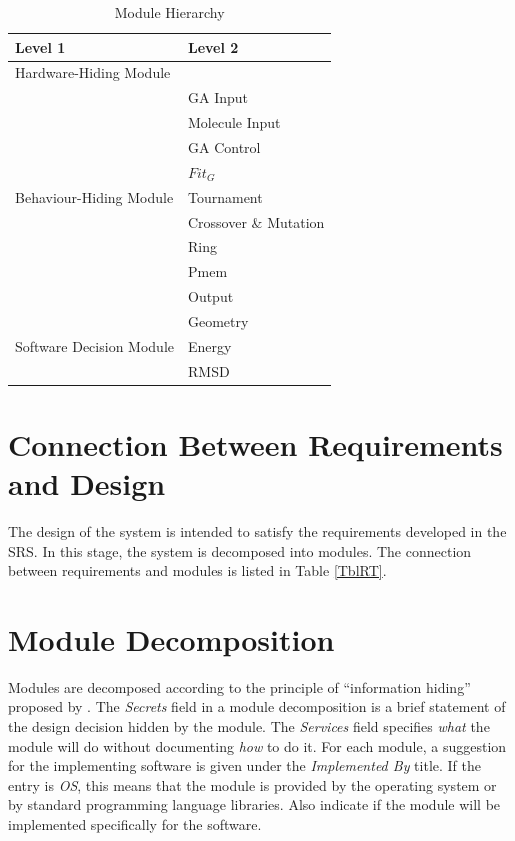 \documentclass[12pt, titlepage]{article}
\begin{document}
\begin{table}[h!]
\centering
\begin{tabular}{p{} p{}}
\toprule
\textbf{Level 1} & \textbf{Level 2}\\
\midrule

{Hardware-Hiding Module} & ~ \\
\midrule

\multirow{9}{0.3\textwidth}{Behaviour-Hiding Module}& GA Input \\
													& Molecule Input \\
													& GA Control\\
													& $Fit_G$ \\
													& Tournament \\
													& Crossover \& Mutation \\
													& Ring \\
													& Pmem \\
													& Output \\

\midrule

\multirow{3}{0.3\textwidth}{Software Decision Module} & Geometry \\
													  & Energy \\
													  & RMSD \\
\bottomrule

\end{tabular}
\caption{Module Hierarchy}
\label{TblMH}
\end{table}

\section{Connection Between Requirements and Design} \label{SecConnection}

The design of the system is intended to satisfy the requirements developed in
the SRS. In this stage, the system is decomposed into modules. The connection
between requirements and modules is listed in Table \ref{TblRT}.

\section{Module Decomposition} \label{SecMD}

Modules are decomposed according to the principle of ``information hiding''
proposed by \citet{ParnasEtAl1984}. The \emph{Secrets} field in a module
decomposition is a brief statement of the design decision hidden by the
module. The \emph{Services} field specifies \emph{what} the module will do
without documenting \emph{how} to do it. For each module, a suggestion for the
implementing software is given under the \emph{Implemented By} title. If the
entry is \emph{OS}, this means that the module is provided by the operating
system or by standard programming language libraries.  Also indicate if the
module will be implemented specifically for the software.
\end{document}
